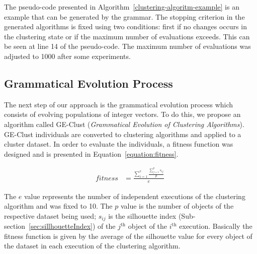 \documentclass[journal]{IEEEtran}
\begin{document}
	The pseudo-code presented in Algorithm~\ref{clustering-algoritm-example} is an example that can be generated by the grammar. The stopping criterion in the generated algorithms is fixed using two conditions: first if no changes occurs in the clustering state or if the maximum number of evaluations exceeds. This can be seen at line 14 of the pseudo-code. The maximum number of evaluations was adjusted to 1000 after some experiments.
	
	
\subsection{Grammatical Evolution Process}

The next step of our approach is the grammatical evolution process which consists of evolving populations of integer vectors. To do this, we propose an algorithm called GE-Clust ({\it Grammatical Evolution of Clustering Algorithms}). GE-Clust individuals are converted to clustering algorithms and applied to a cluster dataset. In order to evaluate the individuals, a fitness function was designed and is presented in Equation~\ref{equation:fitness}.
	
	\begin{align}
	\label{equation:fitness}
	fitness    &= \frac{\sum_{i=1}^e \frac{\sum_{j=1}^{p} s_{ij}}{p}}{e}
	\
	\end{align}
	
	The $e$ value represents the number of independent executions of the clustering algorithm and was fixed to 10. The $p$ value is the number of objects of the respective dataset being used; $s_{ij}$ is the silhouette index (Sub-section~\ref{sec:sillhouetteIndex}) of the $j^{\text{th}}$ object of the $i^{\text{th}}$ execution. Basically the fitness function is given by the average of the silhouette value for every object of the dataset in each execution of the clustering algorithm.
	
\end{document}
